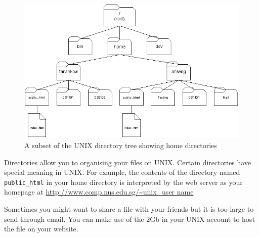\begin{frame}
\begin{figure}
\begin{center}
\includegraphics[scale=0.4]{file_home}
\end{center}
\caption{A subset of the UNIX directory tree showing home directories}
\label{fig:dir}
\end{figure}
\end{frame}

Directories allow you to organising your files on UNIX.  Certain directories
have special meaning in UNIX. For example, the contents of the directory named
\texttt{public\_html} in your home directory is interpreted by the web server as
your homepage at \url{http://www.comp.nus.edu.sg/~unix_user name}

Sometimes you might want to share a file with your friends but it is too large
to send through email. You can make use of the 2Gb in your UNIX account to host
the file on your website. 
